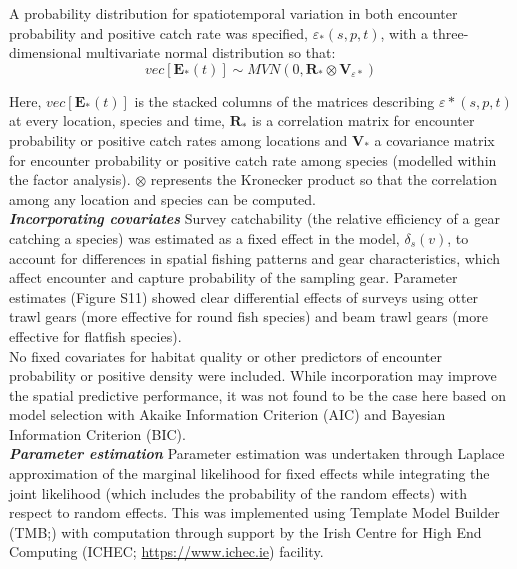 \documentclass[fleqn,10pt]{wlscirep}
\begin{document}
\begin{linenumbers}
A probability distribution for spatiotemporal variation in both encounter
probability and positive catch rate was specified, $\varepsilon_{*}(s,p,t)$,
with a three-dimensional multivariate normal distribution so that:
	\begin{equation}
		vec[\mathbf{E}_{*}(t)] \sim MVN(0,\mathbf{R}_{*} \otimes
		\mathbf{V}_{{\varepsilon}{*}})
	\end{equation}

Here, $vec[\mathbf{E}_{*}(t)]$ is the stacked columns of the matrices
describing $\varepsilon{*}(s,p,t)$ at every location, species and time,
$\mathbf{R}_{*}$ is a correlation matrix for encounter probability or positive
catch rates among locations and $\mathbf{V}_{*}$ a covariance matrix for
encounter probability or positive catch rate among species (modelled within the
factor analysis). $\otimes$ represents the Kronecker product so that the
correlation among any location and species can be computed\cite{Thorson2017}.\\
		
\textbf{\textit{Incorporating covariates}} Survey catchability (the relative
efficiency of a gear catching a species) was estimated as a fixed effect in the
model, $\delta_{s}(v)$, to account for differences in spatial fishing patterns
and gear characteristics, which affect encounter and capture probability of the
sampling gear\cite{Thorson2014}. Parameter estimates (Figure S11) showed clear
differential effects of surveys using otter trawl gears (more effective for
round fish species) and beam trawl gears (more effective for flatfish
species).\\

No fixed covariates for habitat quality or other predictors of encounter
probability or positive density were included. While incorporation may improve
the spatial predictive performance\cite{Thorson2017}, it was not found to be
the case here based on model selection with Akaike Information Criterion (AIC)
and Bayesian Information Criterion (BIC).\\

\textbf{\textit{Parameter estimation}} Parameter estimation was undertaken
through Laplace approximation of the marginal likelihood for fixed effects
while integrating the joint likelihood (which includes the probability of the
random effects) with respect to random effects. This was implemented using
Template Model Builder (TMB;\cite{Kristensen2015}) with computation through
support by the Irish Centre for High End Computing (ICHEC;
\url{https://www.ichec.ie}) facility.  \\


\end{linenumbers}
\end{document}
